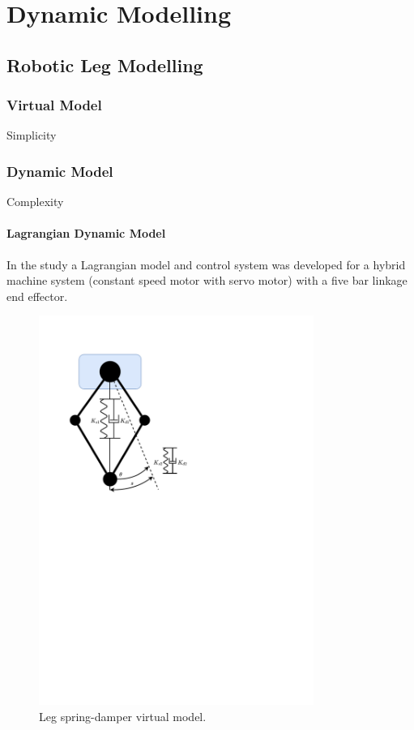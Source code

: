 \chapter{Dynamic Modelling}
\label{chap:Dynamic Modelling}

\section{Robotic Leg Modelling}

\subsection{Virtual Model}
Simplicity 
\subsection{Dynamic Model}
Complexity
\subsubsection{Lagrangian Dynamic Model}
In the study \cite{Yu2006} a Lagrangian model and control system was developed for a hybrid machine system (constant speed motor with servo motor) with a five bar linkage end effector. 

\begin{figure}
\centering
\includegraphics[clip, trim=2cm 15cm 9cm 2cm, page = 1, width=0.8\textwidth]{images/geometry/leg-spring-damper} 
\caption{Leg spring-damper virtual model.}
\label{fig:Leg spring-damper virtual model}
\end{figure}

